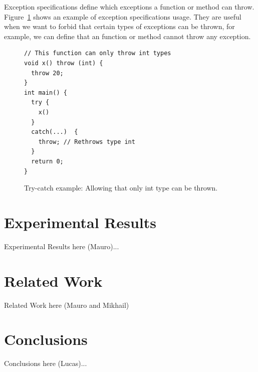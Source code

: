 \documentclass[a4paper]{llncs}
\begin{document}
Exception specifications define which exceptions a function or method can throw. Figure~\ref{figure:try-catch-example-allowing-that-only-int-type-can-be-thrown} shows an example of exception specifications
usage. They are useful when we want to forbid that certain types of exceptions can be thrown, for example, we can define that an function
or method cannot throw any exception.

\begin{figure}[ht]
\centering
\begin{minipage}{0.7\textwidth}
\begin{lstlisting}
// This function can only throw int types
void x() throw (int) { 
  throw 20;
}
int main() {
  try {
    x()
  }
  catch(...)  { 
    throw; // Rethrows type int
  }
  return 0;
}
\end{lstlisting}
\end{minipage}
\caption{Try-catch example: Allowing that only int type can be thrown.}
\label{figure:try-catch-example-allowing-that-only-int-type-can-be-thrown}
\end{figure}

\section{Experimental Results}
%
Experimental Results here (Mauro)...



\section{Related Work}
%
Related Work here (Mauro and Mikhail)

\section{Conclusions}
%
Conclusions here (Lucas)...


\end{document}
